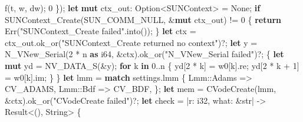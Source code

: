 \documentclass[
  10pt,
]{article}
\newenvironment{Shaded}{}{}
\newcommand{\ConstantTok}[1]{\textcolor[rgb]{0.53,0.00,0.00}{#1}}
\newcommand{\ControlFlowTok}[1]{\textcolor[rgb]{0.00,0.44,0.13}{\textbf{#1}}}
\newcommand{\DataTypeTok}[1]{\textcolor[rgb]{0.56,0.13,0.00}{#1}}
\newcommand{\DecValTok}[1]{\textcolor[rgb]{0.25,0.63,0.44}{#1}}
\newcommand{\KeywordTok}[1]{\textcolor[rgb]{0.00,0.44,0.13}{\textbf{#1}}}
\newcommand{\NormalTok}[1]{#1}
\newcommand{\OperatorTok}[1]{\textcolor[rgb]{0.40,0.40,0.40}{#1}}
\newcommand{\PreprocessorTok}[1]{\textcolor[rgb]{0.74,0.48,0.00}{#1}}
\newcommand{\StringTok}[1]{\textcolor[rgb]{0.25,0.44,0.63}{#1}}
\begin{document}
\begin{Shaded}
\begin{Highlighting}[]
\NormalTok{        f(t}\OperatorTok{,}\NormalTok{ w}\OperatorTok{,}\NormalTok{ dw)}\OperatorTok{;}
        \DecValTok{0}
    \OperatorTok{\}}\NormalTok{)}\OperatorTok{;}
    \KeywordTok{let} \KeywordTok{mut}\NormalTok{ ctx\_out}\OperatorTok{:} \DataTypeTok{Option}\OperatorTok{\textless{}}\NormalTok{SUNContext}\OperatorTok{\textgreater{}} \OperatorTok{=} \ConstantTok{None}\OperatorTok{;}
    \ControlFlowTok{if}\NormalTok{ SUNContext\_Create(SUN\_COMM\_NULL}\OperatorTok{,} \OperatorTok{\&}\KeywordTok{mut}\NormalTok{ ctx\_out) }\OperatorTok{!=} \DecValTok{0} \OperatorTok{\{}
        \ControlFlowTok{return} \ConstantTok{Err}\NormalTok{(}\StringTok{"SUNContext\_Create failed"}\OperatorTok{.}\NormalTok{into())}\OperatorTok{;}
    \OperatorTok{\}}
    \KeywordTok{let}\NormalTok{ ctx }\OperatorTok{=}\NormalTok{ ctx\_out}\OperatorTok{.}\NormalTok{ok\_or(}\StringTok{"SUNContext\_Create returned no context"}\NormalTok{)}\OperatorTok{?;}
    \KeywordTok{let}\NormalTok{ y }\OperatorTok{=}\NormalTok{ N\_VNew\_Serial(}\DecValTok{2} \OperatorTok{*}\NormalTok{ n }\KeywordTok{as} \DataTypeTok{i64}\OperatorTok{,} \OperatorTok{\&}\NormalTok{ctx)}\OperatorTok{.}\NormalTok{ok\_or(}\StringTok{"N\_VNew\_Serial failed"}\NormalTok{)}\OperatorTok{?;}
    \OperatorTok{\{}
        \KeywordTok{let} \KeywordTok{mut}\NormalTok{ yd }\OperatorTok{=}\NormalTok{ NV\_DATA\_S(}\OperatorTok{\&}\NormalTok{y)}\OperatorTok{;}
        \ControlFlowTok{for}\NormalTok{ k }\KeywordTok{in} \DecValTok{0}\OperatorTok{..}\NormalTok{n }\OperatorTok{\{}
\NormalTok{            yd[}\DecValTok{2} \OperatorTok{*}\NormalTok{ k] }\OperatorTok{=}\NormalTok{ w0[k]}\OperatorTok{.}\NormalTok{re}\OperatorTok{;}
\NormalTok{            yd[}\DecValTok{2} \OperatorTok{*}\NormalTok{ k }\OperatorTok{+} \DecValTok{1}\NormalTok{] }\OperatorTok{=}\NormalTok{ w0[k]}\OperatorTok{.}\NormalTok{im}\OperatorTok{;}
        \OperatorTok{\}}
    \OperatorTok{\}}
    \KeywordTok{let}\NormalTok{ lmm }\OperatorTok{=} \ControlFlowTok{match}\NormalTok{ settings}\OperatorTok{.}\NormalTok{lmm }\OperatorTok{\{}
        \PreprocessorTok{Lmm::}\NormalTok{Adams }\OperatorTok{=\textgreater{}}\NormalTok{ CV\_ADAMS}\OperatorTok{,}
        \PreprocessorTok{Lmm::}\NormalTok{Bdf }\OperatorTok{=\textgreater{}}\NormalTok{ CV\_BDF}\OperatorTok{,}
    \OperatorTok{\};}
    \KeywordTok{let}\NormalTok{ mem }\OperatorTok{=}\NormalTok{ CVodeCreate(lmm}\OperatorTok{,} \OperatorTok{\&}\NormalTok{ctx)}\OperatorTok{.}\NormalTok{ok\_or(}\StringTok{"CVodeCreate failed"}\NormalTok{)}\OperatorTok{?;}
    \KeywordTok{let}\NormalTok{ check }\OperatorTok{=} \OperatorTok{|}\NormalTok{r}\OperatorTok{:} \DataTypeTok{i32}\OperatorTok{,}\NormalTok{ what}\OperatorTok{:} \OperatorTok{\&}\DataTypeTok{str}\OperatorTok{|} \OperatorTok{{-}\textgreater{}} \DataTypeTok{Result}\OperatorTok{\textless{}}\NormalTok{()}\OperatorTok{,} \DataTypeTok{String}\OperatorTok{\textgreater{}} \OperatorTok{\{}

\end{Highlighting}
\end{Shaded}
\end{document}
